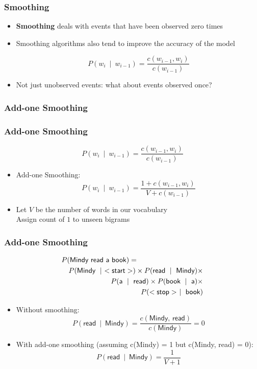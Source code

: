 \begin{frame}
\frametitle{Smoothing}
\begin{itemize}[<+->]

\item {\bf Smoothing} deals with events that have been observed zero times

\item Smoothing algorithms also tend to improve the accuracy of the model

\[ P(w_i~\mid~w_{i-1}) = \frac{ c(w_{i-1},w_i) } { c(w_{i-1}) } \]

\item Not just unobserved events: what about events observed once?
\end{itemize}
\end{frame}

\subsubsection{Add-one Smoothing}

\begin{frame}
\frametitle{Add-one Smoothing}
\[ P(w_i~\mid~w_{i-1}) = \frac{ c(w_{i-1},w_i) } { c(w_{i-1}) } \]
\begin{itemize}[<+->]
\item Add-one Smoothing:
\[ P(w_i~\mid~w_{i-1}) = \frac{ 1 + c(w_{i-1},w_i) } { V + c(w_{i-1}) } \]
\item Let $V$ be the number of words in our vocabulary \\
 Assign count of $1$ to unseen bigrams
\end{itemize}
\end{frame}

\begin{frame}
\frametitle{Add-one Smoothing}
\begin{eqnarray*}
\lefteqn{P(\textsf{Mindy read a book})=}\\
&& P(\textsf{Mindy}~\mid~<\textsf{start}>) \times P(\textsf{read}~\mid~\textsf{Mindy}) \times \\
&& P(\textsf{a}~\mid~\textsf{read}) \times P(\textsf{book}~\mid~\textsf{a}) \times \\
&& P(<\textsf{stop}>~\mid~\textsf{book})
\end{eqnarray*}
\begin{itemize}[<+->]
\item Without smoothing:
\[ P(\textsf{read}~\mid~\textsf{Mindy}) = \frac{ c(\textsf{Mindy, read}) } { c(\textsf{Mindy}) }  = 0 \]
\item With add-one smoothing (assuming c(Mindy) = 1 but c(Mindy, read)
  = 0):
\[ P(\textsf{read}~\mid~\textsf{Mindy}) = \frac{ 1 } { V + 1 }  \]
\end{itemize}
\end{frame}

